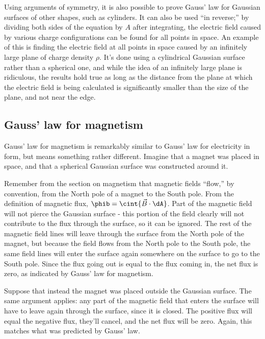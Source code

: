 \documentclass[12pt]{article}
\begin{document}
Using arguments of symmetry, it is also possible to prove Gauss' law for Gaussian surfaces of other shapes, such as cylinders. It can also be used ``in reverse;'' by dividing both sides of the equation by $A$ after integrating, the electric field caused by various charge configurations can be found for all points in space. An example of this is finding the electric field at all points in space caused by an infinitely large plane of charge density $\rho$. It's done using a cylindrical Gaussian surface rather than a spherical one, and while the idea of an infinitely large plane is ridiculous, the results hold true as long as the distance from the plane at which the electric field is being calculated is significantly smaller than the size of the plane, and not near the edge.

\subsection{Gauss' law for magnetism}

Gauss' law for magnetism is remarkably similar to Gauss' law for electricity in form, but means something rather different. Imagine that a magnet was placed in space, and that a spherical Gaussian surface was constructed around it. 

Remember from the section on magnetism that magnetic fields ``flow,'' by convention, from the North pole of a magnet to the South pole. From the definition of magnetic flux, $\displaystyle \phib = \cint{\vec{B}\cdot\dA}$. Part of the magnetic field will not pierce the Gaussian surface - this portion of the field clearly will not contribute to the flux through the surface, so it can be ignored. The rest of the magnetic field lines will leave through the surface from the North pole of the magnet, but because the field flows from the North pole to the South pole, the same field lines will enter the surface again somewhere on the surface to go to the South pole. Since the flux going out is equal to the flux coming in, the net flux is zero, as indicated by Gauss' law for magnetism.

Suppose that instead the magnet was placed outside the Gaussian surface. The same argument applies: any part of the magnetic field that enters the surface will have to leave again through the surface, since it is closed. The positive flux will equal the negative flux, they'll cancel, and the net flux will be zero. Again, this matches what was predicted by Gauss' law.
\end{document}
